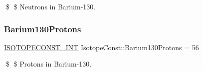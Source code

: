 \$ \$ Neutrons in Barium-\/130. \mbox{\label{group___isotope_const-_barium-_ba130_gab4294f6e02c6f4bd10a8fbc347e9651d}} 
\subsubsection{\texorpdfstring{Barium130\+Protons}{Barium130Protons}}
{\footnotesize\ttfamily \mbox{\hyperlink{group___isotope_const-_macros_ga5f18360b3e99483a35c32d789e62621c}{I\+S\+O\+T\+O\+P\+E\+C\+O\+N\+S\+T\+\_\+\+I\+NT}} Isotope\+Const\+::\+Barium130\+Protons = 56}

\$ \$ Protons in Barium-\/130. 
